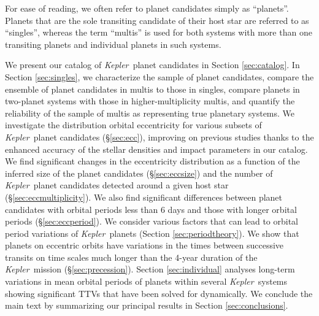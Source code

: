 \documentclass{aastex62}
\newcommand{\ik}{{\it Kepler~}}
\begin{document}
For ease of reading, we often refer to planet candidates simply as ``planets''. Planets that are the sole transiting candidate of their host star are referred to as ``singles'', whereas the term  ``multis'' is used for both systems with more than one transiting planets and individual planets in such systems.  

We present our catalog of \ik planet candidates in Section \ref{sec:catalog}. In Section \ref{sec:singles}, we {characterize the sample of planet candidates, }compare the ensemble of planet candidates in multis to those in singles, compare planets in two-planet systems with those in higher-multiplicity multis, and quantify the reliability of the sample of multis as representing true planetary systems.  
{We investigate the distribution orbital eccentricity for various subsets of \ik planet candidates (\S\ref{sec:ecc}), improving on previous studies thanks to 
the enhanced accuracy of the stellar densities and impact parameters in our catalog.   We find significant changes in the eccentricity distribution as a function of the inferred size of the planet candidates (\S\ref{sec:eccsize}) and the number of \ik planet candidates detected around a given host star (\S\ref{sec:eccmultiplicity}). We also find significant differences between planet candidates with orbital periods less than 6 days and those with longer orbital periods (\S\ref{sec:eccperiod}).}
We  {consider various factors that can lead to} orbital period variations of \ik planets   (Section \ref{sec:periodtheory}). {We show that planets on eccentric orbits have variations in the times between successive transits on time scales much longer than the 4-year duration of the \ik mission  (\S\ref{sec:precession}). Section \ref{sec:individual} analyses long-term variations in mean orbital periods of planets  within  several \ik systems  showing significant TTVs that have been solved for dynamically.}  We conclude the main text by summarizing our principal results in Section  \ref{sec:conclusions}.
\end{document}
